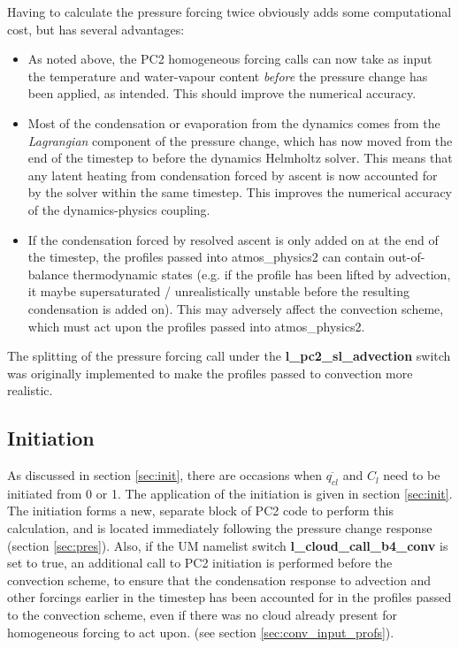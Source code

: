 \documentclass{UMDP_article}
\begin{document}
Having to calculate the pressure forcing twice obviously adds some
computational cost, but has several advantages:
\begin{itemize}
\item As noted above, the PC2 homogeneous forcing calls can now take
as input the temperature and water-vapour content \textit{before}
the pressure change has been applied, as intended.  This should improve
the numerical accuracy.
\item Most of the condensation or evaporation from the dynamics comes from
the \textit{Lagrangian} component of the pressure change, which has now moved
from the end of the timestep to before the dynamics Helmholtz solver.
This means that any latent heating from condensation forced by ascent is now
accounted for by the solver within the same timestep.
This improves the numerical accuracy of the dynamics-physics coupling.
\item If the condensation forced by resolved ascent is only added on at the
end of the timestep, the profiles passed into atmos\_physics2 can contain
out-of-balance thermodynamic states (e.g. if the profile has been lifted
by advection, it maybe supersaturated / unrealistically unstable before
the resulting condensation is added on).  This may adversely affect the
convection scheme, which must act upon the profiles passed into
atmos\_physics2.
\end{itemize}

The splitting of the pressure forcing call under the
\textbf{l\_pc2\_sl\_advection} switch was originally implemented to make the
profiles passed to convection more realistic.

\subsection{Initiation}
\label{sec:init2}
As discussed in section \ref{sec:init}, there are occasions when
$\overline{q_{cl}}$ and $C_l$ need to be initiated from 0 or 1.
The application of the initiation is given in section \ref{sec:init}.
The initiation forms a new, separate block of PC2 code to perform this
calculation, and is located immediately following the pressure change
response (section \ref{sec:pres}).
Also, if the UM namelist switch {\bf l\_cloud\_call\_b4\_conv} is set to
true, an additional call to PC2 initiation is performed before the
convection scheme, to ensure that the condensation response to
advection and other forcings earlier in the timestep has been accounted for
in the profiles passed to the convection scheme, even if there was no
cloud already present for homogeneous forcing to act upon.
(see section \ref{sec:conv_input_profs}).
\end{document}
